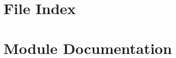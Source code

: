 \let\mypdfximage\pdfximage\def\pdfximage{\immediate\mypdfximage}\documentclass[twoside]{book}
\newcommand{\+}{\discretionary{\mbox{\scriptsize$\hookleftarrow$}}{}{}}
\begin{document}
\chapter{File Index}

\chapter{Module Documentation}

















\end{document}
